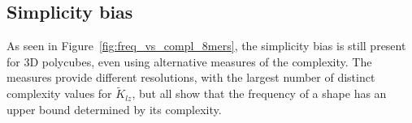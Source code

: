 




\subsection{Simplicity bias}

As seen in Figure~\ref{fig:freq_vs_compl_8mers}, the simplicity bias is still present for 3D polycubes, even using alternative measures of the complexity. The measures provide different resolutions, with the largest number of distinct complexity values for \(\widetilde{K}_{lz}\), but all show that the frequency of a shape has an upper bound determined by its complexity.

